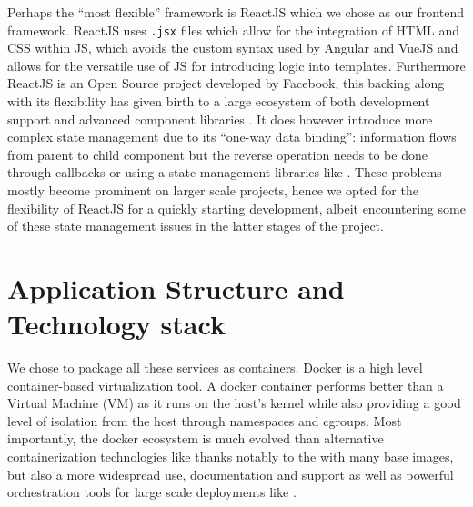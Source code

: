 \documentclass[\version]{l4proj}
\begin{document}
Perhaps the ``most flexible'' framework is ReactJS which we chose as our frontend framework.
ReactJS uses \lstinline{.jsx} files which allow for the integration of HTML and CSS within JS, which avoids the custom syntax used by Angular and VueJS and allows for the versatile use of JS for introducing logic into templates.
Furthermore ReactJS is an Open Source project developed by Facebook, this backing along with its flexibility has given birth to a large ecosystem of both development support and advanced component libraries \autocite{wohlgethanSupportingWebDevelopmentDecisions2018}.
It does however introduce more complex state management due to its ``one-way data binding'': information flows from parent to child component but the reverse operation needs to be done through callbacks or using a state management libraries like \textcite{Redux2020}.
These problems mostly become prominent on larger scale projects, hence we opted for the flexibility of ReactJS for a quickly starting development, albeit encountering some of these state management issues in the latter stages of the project.

\section{Application Structure and Technology stack}

We chose to package all these services as \textcite{Docker2020} containers.
Docker is a high level container-based virtualization tool.
A docker container performs better than a Virtual Machine (VM) as it runs on the host's kernel while also providing a good level of isolation from the host through namespaces and cgroups.
Most importantly, the docker ecosystem is much evolved than alternative containerization technologies like \textcite{Lxc2020} thanks notably to the \textcite{DockerHub} with many base images, but also a more widespread use, documentation and support as well as powerful orchestration tools for large scale deployments like \textcite{Kubernetes2020}.
\end{document}
